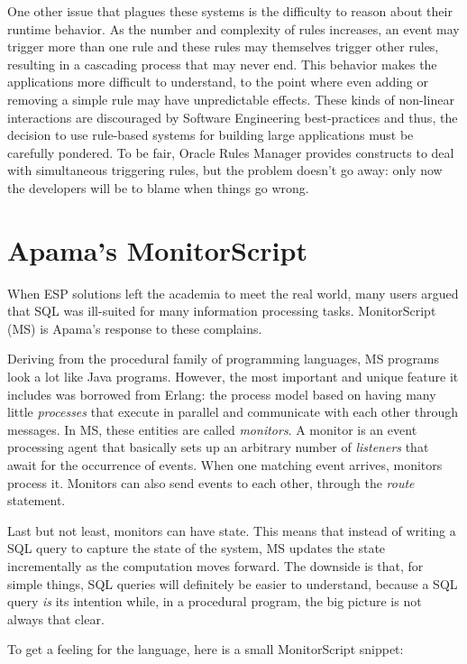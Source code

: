 \documentclass{report}
\begin{document}
One other issue that plagues these systems is the difficulty to reason
about their runtime behavior. As the number and complexity of rules
increases, an event may trigger more than one rule and these rules may
themselves trigger other rules, resulting in a cascading process that
may never end. This behavior makes the applications more difficult to
understand, to the point where even adding or removing a simple rule
may have unpredictable effects. These kinds of non-linear interactions
are discouraged by Software Engineering best-practices and thus, the
decision to use rule-based systems for building large applications
must be carefully pondered. To be fair, Oracle Rules Manager provides
constructs to deal with simultaneous triggering rules, but the problem
doesn't go away: only now the developers will be to blame when things
go wrong.

\section{Apama's MonitorScript}

When ESP solutions left the academia to meet the real world, many
users argued that SQL was ill-suited for many information processing
tasks. MonitorScript (MS) is Apama's response to these complains.

Deriving from the procedural family of programming languages, MS
programs look a lot like Java programs. However, the most important
and unique feature it includes was borrowed from Erlang: the process
model based on having many little \emph{processes} that execute in
parallel and communicate with each other through messages. In MS,
these entities are called \emph{monitors}. A monitor is an event
processing agent that basically sets up an arbitrary number of
\emph{listeners} that await for the occurrence of events. When one
matching event arrives, monitors process it. Monitors can also send
events to each other, through the \emph{route} statement.

Last but not least, monitors can have state. This means that instead
of writing a SQL query to capture the state of the system, MS updates
the state incrementally as the computation moves forward. The downside
is that, for simple things, SQL queries will definitely be easier to
understand, because a SQL query \emph{is} its intention while, in a
procedural program, the big picture is not always that clear.

To get a feeling for the language, here is a small MonitorScript
snippet:
\end{document}
